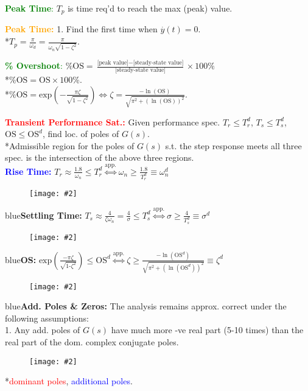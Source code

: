 \documentclass[5pt]{extarticle} %
\newcommand{\customFigure}[3][]{%
    \vspace{-1.5em}
    \begin{figure}[H]
        \centering
        \texttt{[image: \#2]}
    \end{figure}
    \vspace{-1.5em}
}
\begin{document}
\begin{paracol}{3}
{    \textcolor{green}{\textbf{Peak Time}:} $T_p$ is time req'd to reach the max (peak) value.

    \textcolor{orange}{\textbf{Peak Time:}} 1. Find the first time when $\overset{\cdot}{y}(t) = 0$. \\
    *$\boxed{T_p = \frac{\pi}{\omega_d} = \frac{\pi}{\omega_n \sqrt{1 - \zeta^2}}}$.

    \textcolor{green}{\textbf{\% Overshoot}:} $\% \text{OS} = \frac{\text{[peak value]} - \text{[steady-state value]}}{\text{[steady-state value]}} \times 100\%$ \\
    *$\text{\% OS} = \text{OS} \times 100 \%$. \\
    *$\boxed{\% \text{OS} = \text{exp}\left(-\frac{\pi \zeta}{\sqrt{1-\zeta^2}}\right) \iff \zeta = \frac{-\ln(\text{OS})}{\sqrt{\pi^2 + (\ln(\text{OS}))^2}}}$.

    \switchcolumn
    \newpage

    \textcolor{red}{\textbf{Transient Performance Sat.:}} Given performance spec. $T_r \leq T_r^d$, $T_s \leq T_s^d$, $\text{OS} \leq \text{OS}^d$, find loc. of poles of $G(s)$. \\
    *Admissible region for the poles of $G(s)$ s.t. the step response meets all three spec. is the intersection of the above three regions. \\
    \textcolor{blue}{\textbf{Rise Time:}} $T_r \approx \frac{1.8}{\omega_n} \leq T_r^d \overset{\text{app.}}{\iff} \omega_n \geq \frac{1.8}{T_r^d} \equiv \omega_n^d$ 

    \customFigure[0.1]{../Images/L12_0.png}

    \textcolor{blue}{\textbf{Settling Time:}} $T_s \approx \frac{4}{\zeta \omega_n} = \frac{4}{\sigma} \leq T_s^d \overset{\text{app.}}{\iff} \sigma \geq \frac{4}{T_s^d} \equiv \sigma^d$ 
    \customFigure[0.1]{../Images/L12_1.png}

    \textcolor{blue}{\textbf{OS:}} $\text{exp}\left(\frac{-\pi \zeta}{\sqrt{1\text{-}\zeta^2}}\right) \leq \text{OS}^d \overset{\text{app.}}{\iff} \zeta \geq \frac{-\ln(\text{OS}^d)}{\sqrt{\pi^2 + (\ln(\text{OS}^d))^2}} \equiv \zeta^d$ 
    \customFigure[0.1]{../Images/L12_2.png}

    \textcolor{blue}{\textbf{Add. Poles \& Zeros:}} The analysis remains approx. correct under the following assumptions: \\
    1. Any add. poles of $G(s)$ have much more -ve real part (5-10 times) than the real part of the dom. complex conjugate poles. 
    \customFigure[0.2]{../Images/L12_3.png} \\
    *\textcolor{red}{dominant poles}, \textcolor{blue}{additional poles}.

}
\end{paracol}
\end{document}
